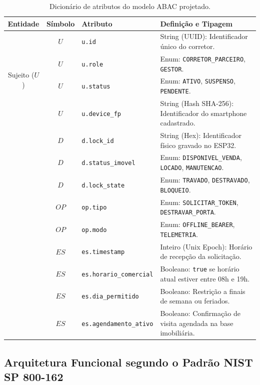 \begin{table}[htbp]
\centering
\footnotesize
\caption{Dicionário de atributos do modelo ABAC projetado.}
\label{quadro:dicionario-atributos}
\begin{tabularx}{\textwidth}{cc p{4.2cm} X}
\toprule
\textbf{Entidade} & \textbf{Símbolo} & \textbf{Atributo} & \textbf{Definição e Tipagem} \\
\midrule
\multirow{4}{*}{Sujeito ($U$)} 
 & $U$ & \texttt{u.id} & String (UUID): Identificador único do corretor. \\
 & $U$ & \texttt{u.role} & Enum: \texttt{CORRETOR\_PARCEIRO}, \texttt{GESTOR}. \\
 & $U$ & \texttt{u.status} & Enum: \texttt{ATIVO}, \texttt{SUSPENSO}, \texttt{PENDENTE}. \\
 & $U$ & \texttt{u.device\_fp} & String (Hash SHA-256): Identificador do smartphone cadastrado. \\
\addlinespace
\multirow{3}{*}{Objeto ($D$)} 
 & $D$ & \texttt{d.lock\_id} & String (Hex): Identificador físico gravado no ESP32. \\
 & $D$ & \texttt{d.status\_imovel} & Enum: \texttt{DISPONIVEL\_VENDA}, \texttt{LOCADO}, \texttt{MANUTENCAO}. \\
 & $D$ & \texttt{d.lock\_state} & Enum: \texttt{TRAVADO}, \texttt{DESTRAVADO}, \texttt{BLOQUEIO}. \\
\addlinespace
\multirow{2}{*}{Ação ($OP$)} 
 & $OP$ & \texttt{op.tipo} & Enum: \texttt{SOLICITAR\_TOKEN}, \texttt{DESTRAVAR\_PORTA}. \\
 & $OP$ & \texttt{op.modo} & Enum: \texttt{OFFLINE\_BEARER}, \texttt{TELEMETRIA}. \\
\addlinespace
\multirow{4}{*}{Ambiente ($ES$)} 
 & $ES$ & \texttt{es.timestamp} & Inteiro (Unix Epoch): Horário de recepção da solicitação. \\
 & $ES$ & \texttt{es.horario\_comercial} & Booleano: \texttt{true} se horário atual estiver entre 08h e 19h. \\
 & $ES$ & \texttt{es.dia\_permitido} & Booleano: Restrição a finais de semana ou feriados. \\
 & $ES$ & \texttt{es.agendamento\_ativo} & Booleano: Confirmação de visita agendada na base imobiliária. \\
\bottomrule
\end{tabularx}
\end{table}

\subsection{Arquitetura Funcional segundo o Padrão NIST SP 800-162}
\label{subsec:arquitetura-nist}

